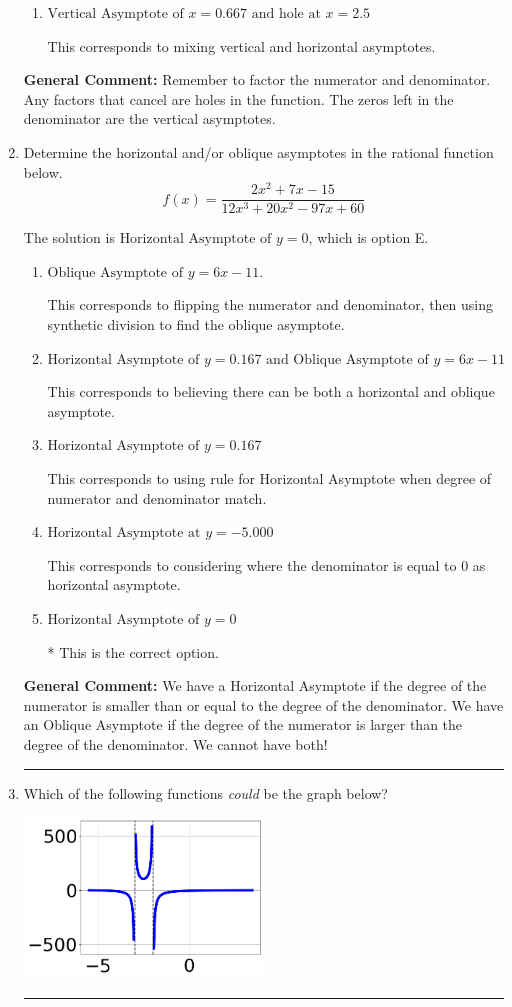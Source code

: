 \documentclass{extbook}[14pt]
\newcommand{\litem}[1]{\item #1

\rule{\textwidth}{0.4pt}}
\begin{document}
\begin{enumerate}
{\begin{enumerate}[label=\Alph*.]
This corresponds to setting the numerator equal to 0.
\item \( \text{Vertical Asymptote of } x = 0.667 \text{ and hole at } x = 2.5 \)

This corresponds to mixing vertical and horizontal asymptotes.
\end{enumerate}

\textbf{General Comment:} Remember to factor the numerator and denominator. Any factors that cancel are holes in the function. The zeros left in the denominator are the vertical asymptotes.
}
\litem{
Determine the horizontal and/or oblique asymptotes in the rational function below.
\[ f(x) = \frac{2x^{2} +7 x -15}{12x^{3} +20 x^{2} -97 x + 60} \]

The solution is \( \text{Horizontal Asymptote of } y = 0 \), which is option E.\begin{enumerate}[label=\Alph*.]
\item \( \text{Oblique Asymptote of } y = 6x -11. \)

This corresponds to flipping the numerator and denominator, then using synthetic division to find the oblique asymptote.
\item \( \text{Horizontal Asymptote of } y = 0.167 \text{ and Oblique Asymptote of } y = 6x -11 \)

This corresponds to believing there can be both a horizontal and oblique asymptote.
\item \( \text{Horizontal Asymptote of } y = 0.167  \)

This corresponds to using rule for Horizontal Asymptote when degree of numerator and denominator match.
\item \( \text{Horizontal Asymptote at } y = -5.000 \)

This corresponds to considering where the denominator is equal to 0 as horizontal asymptote.
\item \( \text{Horizontal Asymptote of } y = 0 \)

* This is the correct option.
\end{enumerate}

\textbf{General Comment:} We have a Horizontal Asymptote if the degree of the numerator is smaller than or equal to the degree of the denominator. We have an Oblique Asymptote if the degree of the numerator is larger than the degree of the denominator. We cannot have both!
}
\litem{
Which of the following functions \textit{could} be the graph below?

\begin{center}
    \includegraphics[width=0.5\textwidth]{../Figures/identifyGraphOfRationalFunctionCopyC.png}
\end{center}




}
\end{enumerate}
\end{document}
